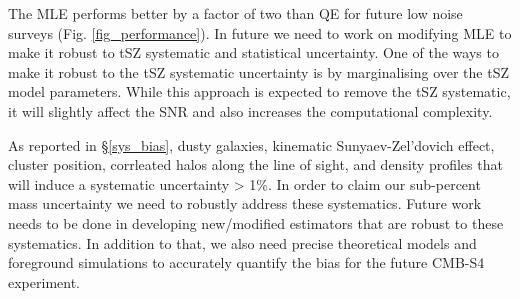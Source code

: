 The MLE performs better by a factor of two than QE for future low noise surveys (Fig. \ref{fig_performance}). 
In future we need to work on modifying MLE to make it robust to tSZ systematic and statistical uncertainty. 
One of the ways to make it robust to the tSZ systematic uncertainty is by marginalising over the tSZ model parameters. 	
While this approach is expected to remove the tSZ systematic, it will slightly affect the SNR and also increases the computational complexity. 

As reported in \S\ref{sys_bias}, dusty galaxies, kinematic Sunyaev-Zel'dovich effect, cluster position, corrleated halos along the line of sight, and density profiles that will induce a systematic uncertainty > 1\%. In order to claim our sub-percent mass uncertainty we need to robustly address these systematics. Future work needs to be done in developing new/modified estimators that are robust to these systematics. In addition to that, we also need precise theoretical models and foreground simulations to accurately quantify the bias for the future CMB-S4 experiment. 
\iffalse{
The uncertainty in the cluster mass profile can bias the mass estimate by a few percent. 
While a few percent systematic bias is well within the statistical uncertainty at the current experimental noise level, however, it will become comparable in the near future. 
In order to reduce the bias due to cluster profile we need better models of cluster density profiles.
}\fi






